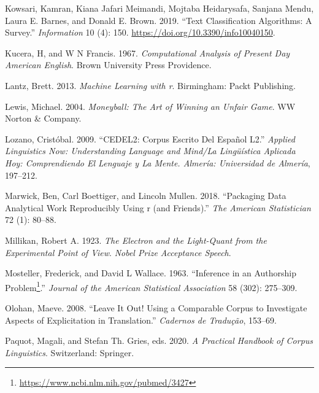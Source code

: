 \documentclass[
  letterpaper,
]{scrbook}
\newlength{\cslhangindent}
\newlength{\cslentryspacingunit} %
\newenvironment{CSLReferences}[2] %
 {%
  \setlength{\parindent}{0pt}
  \ifodd #1
  \let\oldpar\par
  \def\par{\hangindent=\cslhangindent\oldpar}
  \fi
  \setlength{\parskip}{#2\cslentryspacingunit}
 }%
 {}
\DeclareRobustCommand{\href}[2]{#2\footnote{\url{#1}}}
\begin{document}
\begin{CSLReferences}{1}{0}
\leavevmode{}%
Kowsari, Kamran, Kiana Jafari Meimandi, Mojtaba Heidarysafa, Sanjana
Mendu, Laura E. Barnes, and Donald E. Brown. 2019. {``Text
Classification Algorithms: A Survey.''} \emph{Information} 10 (4): 150.
\url{https://doi.org/10.3390/info10040150}.

\leavevmode{}%
Kucera, H, and W N Francis. 1967. \emph{Computational Analysis of
Present Day American English}. Brown University Press Providence.

\leavevmode{}%
Lantz, Brett. 2013. \emph{Machine Learning with r}. Birmingham: Packt
Publishing.

\leavevmode{}%
Lewis, Michael. 2004. \emph{Moneyball: The Art of Winning an Unfair
Game}. WW Norton \& Company.

\leavevmode{}%
Lozano, Cristóbal. 2009. {``CEDEL2: Corpus Escrito Del Español L2.''}
\emph{Applied Linguistics Now: Understanding Language and Mind/La
Lingüística Aplicada Hoy: Comprendiendo El Lenguaje y La Mente. Almería:
Universidad de Almería}, 197--212.

\leavevmode{}%
Marwick, Ben, Carl Boettiger, and Lincoln Mullen. 2018. {``Packaging
Data Analytical Work Reproducibly Using r (and Friends).''} \emph{The
American Statistician} 72 (1): 80--88.

\leavevmode{}%
Millikan, Robert A. 1923. \emph{The Electron and the Light-Quant from
the Experimental Point of View}. \emph{Nobel Prize Acceptance Speech}.

\leavevmode{}%
Mosteller, Frederick, and David L Wallace. 1963.
{``\href{https://www.ncbi.nlm.nih.gov/pubmed/3427}{Inference in an
Authorship Problem}.''} \emph{Journal of the American Statistical
Association} 58 (302): 275--309.

\leavevmode{}%
Olohan, Maeve. 2008. {``Leave It Out! Using a Comparable Corpus to
Investigate Aspects of Explicitation in Translation.''} \emph{Cadernos
de Tradução}, 153--69.

\leavevmode{}%
Paquot, Magali, and Stefan Th. Gries, eds. 2020. \emph{A Practical
Handbook of Corpus Linguistics}. Switzerland: Springer.


\end{CSLReferences}
\end{document}
